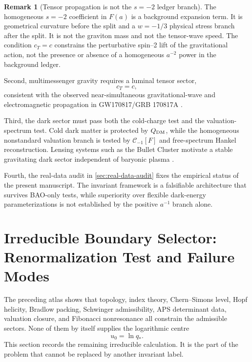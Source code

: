 \documentclass[aps,prd,reprint,nofootinbib,superscriptaddress,floatfix]{revtex4-2}
\numberwithin{equation}{section}
\theoremstyle{definition}
\newtheorem{remark}{Remark}[section]
\theoremstyle{plain}
\begin{document}
\begin{remark}[Tensor propagation is not the \(s=-2\) ledger branch]
The homogeneous \(s=-2\) coefficient in \(F(a)\) is a background expansion term.  It is geometrical curvature before the split and a \(w=-1/3\) physical stress branch after the split.  It is not the graviton mass and not the tensor-wave speed.  The condition \(c_T=c\) constrains the perturbative spin--2 lift of the gravitational action, not the presence or absence of a homogeneous \(a^{-2}\) power in the background ledger.
\end{remark}


Second, multimessenger gravity requires a luminal tensor sector,
\begin{equation}
\boxed{c_T=c,}
\end{equation}
consistent with the observed near-simultaneous gravitational-wave and electromagnetic propagation in GW170817/GRB 170817A \cite{AbbottGW170817,MonitorGRB170817A}.

Third, the dark sector must pass both the cold-charge test and the valuation-spectrum test.  Cold dark matter is protected by \(Q_{\rm DM}\), while the homogeneous nonstandard valuation branch is tested by \(\mathcal C_{-1}[F]\) and free-spectrum Hankel reconstruction.  Lensing systems such as the Bullet Cluster motivate a stable gravitating dark sector independent of baryonic plasma \cite{Clowe2006,Markevitch2004}.

Fourth, the real-data audit in \cref{sec:real-data-audit} fixes the empirical status of the present manuscript.  The invariant framework is a falsifiable architecture that survives BAO-only tests, while superiority over flexible dark-energy parameterizations is not established by the positive \(a^{-1}\) branch alone.



\section{Irreducible Boundary Selector: Renormalization Test and Failure Modes}

The preceding atlas shows that topology, index theory, Chern--Simons level,
Hopf helicity, Bradlow packing, Schwinger admissibility, APS determinant
data, valuation closure, and Fibonacci nonresonance all constrain the
admissible sectors.  None of them by itself supplies the logarithmic centre
\[
        u_0=\ln q_* .
\]
This section records the remaining irreducible calculation.  It is the
part of the problem that cannot be replaced by another invariant label.
\end{document}

